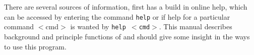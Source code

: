 There are several sources of information, first \Kuplot has a
build in online help, which can be accessed by entering the command
{\tt help} or if help for a particular command $<$cmd$>$ is wanted
by {\tt help $<$cmd$>$}.  This manual describes background and
principle functions of \Kuplot and should give some insight in
the ways to use this program. \par

